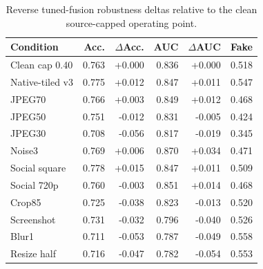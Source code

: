 \begin{table}[t]
\centering
\small
\caption{Reverse tuned-fusion robustness deltas relative to the clean source-capped operating point.}
\label{tab:robustness-stress}
\begin{tabular}{l r r r r r}
\toprule
Condition & Acc. & $\Delta$Acc. & AUC & $\Delta$AUC & Fake \\
\midrule
Clean cap 0.40 & 0.763 & +0.000 & 0.836 & +0.000 & 0.518 \\
Native-tiled v3 & 0.775 & +0.012 & 0.847 & +0.011 & 0.547 \\
JPEG70 & 0.766 & +0.003 & 0.849 & +0.012 & 0.468 \\
JPEG50 & 0.751 & -0.012 & 0.831 & -0.005 & 0.424 \\
JPEG30 & 0.708 & -0.056 & 0.817 & -0.019 & 0.345 \\
Noise3 & 0.769 & +0.006 & 0.870 & +0.034 & 0.471 \\
Social square & 0.778 & +0.015 & 0.847 & +0.011 & 0.509 \\
Social 720p & 0.760 & -0.003 & 0.851 & +0.014 & 0.468 \\
Crop85 & 0.725 & -0.038 & 0.823 & -0.013 & 0.520 \\
Screenshot & 0.731 & -0.032 & 0.796 & -0.040 & 0.526 \\
Blur1 & 0.711 & -0.053 & 0.787 & -0.049 & 0.558 \\
Resize half & 0.716 & -0.047 & 0.782 & -0.054 & 0.553 \\
\bottomrule
\end{tabular}
\end{table}
